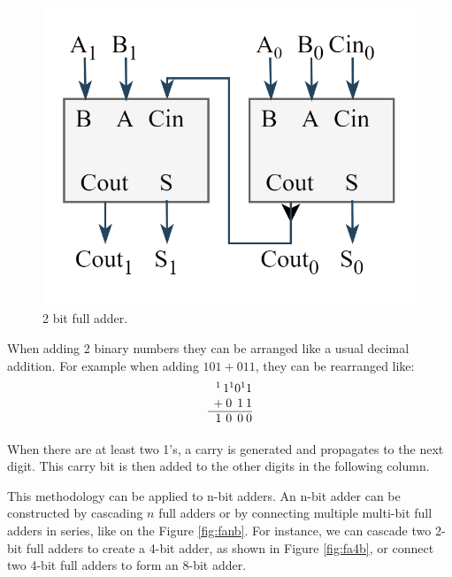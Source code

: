 \documentclass[conference]{IEEEtran}
\begin{document}
	
	\begin{figure}[H]
		\centering
		\includegraphics[width=0.6\columnwidth]{FA_2B}
		\caption{2 bit full adder.}
		\label{fig:fa2b}
	\end{figure}
	
	When adding 2 binary numbers they can be arranged like a usual decimal addition. For example when adding $101 + 011$, they can be rearranged like:
	\[	
	\begin{array}{c@{}c@{}c@{}c@{}}
		^1 & 1^1 & 0^1 & 1 \\ %
		+ & 0 & 1 & 1  \\ %
		\hline
		1 & 0 & 0 & 0  %
	\end{array}
	\]
	
	When there are at least two 1's, a carry is generated and propagates to the next digit. This carry bit is then added to the other digits in the following column.
	
	This methodology can be applied to n-bit adders. An n-bit adder can be constructed by cascading \(n\) full adders or by connecting multiple multi-bit full adders in series, like on the Figure \ref{fig:fanb}. For instance, we can cascade two 2-bit full adders to create a 4-bit adder, as shown in Figure \ref{fig:fa4b}, or connect two 4-bit full adders to form an 8-bit adder.
	
\end{document}
